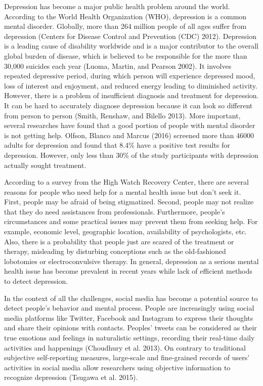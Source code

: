\documentclass[]{article}
\begin{document}
Depression has become a major public health problem around the world.
According to the World Health Organization (WHO), depression is a common
mental disorder. Globally, more than 264 million people of all ages
suffer from depression (Centers for Disease Control and Prevention (CDC)
2012). Depression is a leading cause of disability worldwide and is a
major contributor to the overall global burden of disease, which is
believed to be responsible for the more than 30,000 suicides each year
(Luoma, Martin, and Pearson 2002). It involves repeated depressive
period, during which person will experience depressed mood, loss of
interest and enjoyment, and reduced energy leading to diminished
activity. However, there is a problem of insufficient diagnosis and
treatment for depression. It can be hard to accurately diagnose
depression because it can look so different from person to person
(Smith, Renshaw, and Bilello 2013). More important, several researches
have found that a good portion of people with mental disorder is not
getting help. Olfson, Blanco and Marcus (2016) screened more than 46000
adults for depression and found that 8.4\% have a positive test results
for depression. However, only less than 30\% of the study participants
with depression actually sought treatment.

According to a survey from the High Watch Recovery Center, there are
several reasons for people who need help for a mental health issue but
don't seek it. First, people may be afraid of being stigmatized. Second,
people may not realize that they do need assistances from professionals.
Furthermore, people's circumstances and some practical issues may
prevent them from seeking help. For example, economic level, geographic
location, availability of psychologists, etc. Also, there is a
probability that people just are scared of the treatment or therapy,
misleading by disturbing conceptions such as the old-fashioned
lobotomies or electroconvulsive therapy. In general, depression as a
serious mental health issue has become prevalent in recent years while
lack of efficient methods to detect depression.

In the context of all the challenges, social media has become a
potential source to detect people's behavior and mental process. People
are increasingly using social media platforms like Twitter, Facebook and
Instagram to express their thoughts and share their opinions with
contacts. Peoples' tweets can be considered as their true emotions and
feelings in naturalistic settings, recording their real-time daily
activities and happenings (Choudhury et al. 2013). On contrary to
traditional subjective self-reporting measures, large-scale and
fine-grained records of users' activities in social media allow
researchers using objective information to recognize depression (Tsugawa
et al. 2015).
\end{document}
